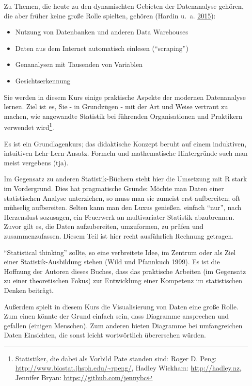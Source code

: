 \documentclass[12pt,ngerman,]{book}
\providecommand{\tightlist}{%
  \setlength{\itemsep}{0pt}\setlength{\parskip}{0pt}}
\let\rmarkdownfootnote\footnote%
\def\footnote{\protect\rmarkdownfootnote}
\begin{document}
Zu Themen, die heute zu den dynamischten Gebieten der Datenanalyse
gehören, die aber früher keine große Rolle spielten, gehören (Hardin
u.~a. \protect\hyperlink{ref-hardin2015data}{2015}):

\begin{itemize}
\tightlist
\item
  Nutzung von Datenbanken und anderen Data Warehouses
\item
  Daten aus dem Internet automatisch einlesen (``scraping'')
\item
  Genanalysen mit Tausenden von Variablen
\item
  Gesichtserkennung
\end{itemize}

Sie werden in diesem Kurs einige praktische Aspekte der modernen
Datenanalyse lernen. Ziel ist es, Sie - in Grundzügen - mit der Art und
Weise vertraut zu machen, wie angewandte Statistik bei führenden
Organisationen und Praktikern verwendet wird\footnote{Statistiker, die
  dabei als Vorbild Pate standen sind: Roger D. Peng:
  \url{http://www.biostat.jhsph.edu/~rpeng/}, Hadley Wickham:
  \url{http://hadley.nz}, Jennifer Bryan:
  \url{https://github.com/jennybc}}.

Es ist ein Grundlagenkurs; das didaktische Konzept beruht auf einem
induktiven, intuitiven Lehr-Lern-Ansatz. Formeln und mathematische
Hintergründe such man meist vergebens (tja).

Im Gegensatz zu anderen Statistik-Büchern steht hier die Umsetzung mit R
stark im Vordergrund. Dies hat pragmatische Gründe: Möchte man Daten
einer statistischen Analyse unterziehen, so muss man sie zumeist erst
aufbereiten; oft mühselig aufbereiten. Selten kann man den Luxus
genießen, einfach ``nur'', nach Herzenslust sozusagen, ein Feuerwerk an
multivariater Statistik abzubrennen. Zuvor gilt es, die Daten
aufzubereiten, umzuformen, zu prüfen und zusammenzufassen. Diesem Teil
ist hier recht ausführlich Rechnung getragen.

``Statistical thinking'' sollte, so eine verbreitete Idee, im Zentrum
oder als Ziel einer Statistik-Ausbildung stehen (Wild und Pfannkuch
\protect\hyperlink{ref-wild1999statistical}{1999}). Es ist die Hoffnung
der Autoren dieses Buches, dass das praktische Arbeiten (im Gegensatz zu
einer theoretischen Fokus) zur Entwicklung einer Kompetenz im
statistischen Denken beiträgt.

Außerdem spielt in diesem Kurs die Visualisierung von Daten eine große
Rolle. Zum einen könnte der Grund einfach sein, dass Diagramme
ansprechen und gefallen (einigen Menschen). Zum anderen bieten Diagramme
bei umfangreichen Daten Einsichten, die sonst leicht wortwörtlich
überersehen würden.
\end{document}
